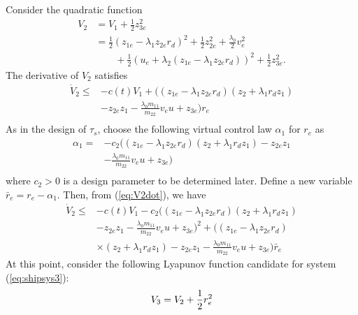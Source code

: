 \documentclass[amsthm, twocolumn]{autart}
\begin{document}
Consider the quadratic function
%
%
\begin{equation}
\begin{aligned}
V_2 &= V_1 + \frac{1}{2} z_{3e}^2 \\
&= \frac{1}{2}(z_{1e} - \lambda_1 z_{2e} r_d)^2 + \frac{1}{2} z_{2e}^2 + \frac{\lambda_0}{2}v_e^2 \\
&\qquad + \frac{1}{2} (u_e + \lambda_2 (z_{1e} - \lambda_1 z_{2e} r_d ))^2 + \frac{1}{2} z_{3e}^2.
\end{aligned}
\end{equation}
%
%
The derivative of $V_2$ satisfies
%
%
\begin{equation}
\begin{split}
\dot{V}_2 \le &-c(t) V_1 + \bigg((z_{1e}-\lambda_1 z_{2e} r_d)(z_2 + \lambda_1 r_d z_1) \\
& - z_{2e} z_1 - \frac{\lambda_0 m_{11}}{m_{22}} v_e u + z_{3e}\bigg) r_e\\
\end{split}
\label{eq:V2dot}
\end{equation}
%
%
As in the design of $\tau_s$, choose the following virtual control law $\alpha_1$ for $r_e$ as 
%
%
\begin{equation}
\begin{split}
\alpha_1 = & -c_2 \bigg((z_{1e} - \lambda_1 z_{2e} r_d)(z_2 + \lambda_1 r_d z_1) - z_{2e} z_1 \\
&  - \frac{\lambda_0 m_{11}}{m_{22}} v_e u + z_{3e} \bigg) \\
\end{split}
\end{equation}
%
%
where $c_2>0$ is a design parameter to be determined later. Define a new variable $\bar{r}_e=r_e-\alpha_1$. Then, from (\ref{eq:V2dot}), we have
%
%
\begin{equation}
\begin{split}
\dot{V}_2 \le &-c(t) V_1 -c_2 \bigg((z_{1e} - \lambda_1 z_{2e} r_d)(z_2 + \lambda_1 r_d z_1) \\ 
& -z_{2e} z_1 - \frac{\lambda_0 m_{11}}{m_{22}} v_e u + z_{3e} \bigg)^2 + \bigg((z_{1e} - \lambda_1 z_{2e} r_d) \\
& \times (z_2 + \lambda_1 r_d z_1) - z_{2e} z_1 - \frac{\lambda_0 m_{11}}{m_{22}} v_e u + z_{3e} \bigg) \bar{r}_e
\end{split}
\label{eq:V2dot2}
\end{equation}
%
%
At this point, consider the following Lyapunov function candidate for system (\ref{eq:shipsys3}):
%
%
\begin{equation}
V_3 =  V_2 + \frac{1}{2} \bar{r}_e^2  \\
\label{eq:V3}
\end{equation}
\end{document}
